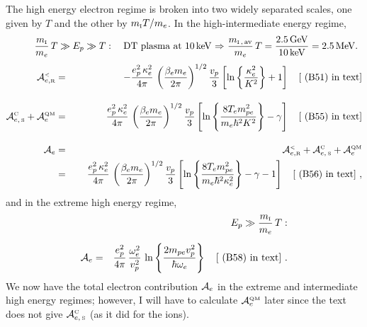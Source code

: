 \documentclass[preprint,12pt,eqsecnum,nofootinbib,amsmath,amssymb]{revtex4}
\newcommand{\smC}{{\rm\scriptscriptstyle C}}
\newcommand{\smI}{{\rm\scriptscriptstyle I}}
\newcommand{\smR}{{\rm\scriptscriptstyle R}}
\newcommand{\smS}{{\rm\scriptscriptstyle S}}
\newcommand{\smQM}{{\rm\scriptscriptstyle QM}}
\newcommand{\smLT}{{\rm\scriptscriptstyle <}}
\begin{document}
The high energy electron regime is broken into two widely separated
scales, one given by $T$ and the other by $m_\smI T/m_e$. In the 
high-intermediate energy regime, 
\begin{eqnarray}
  && \hskip-1.5cm 
  \frac{m_\smI}{m_e}\,T \gg E_p \gg T : 
  ~~~\text{DT plasma at 10\,keV $\Rightarrow$ $\frac{m_{\smI \,,\,{\rm
  av}}}{m_e}\, T = \frac{2.5\,{\rm GeV}}{10\,{\rm keV}}=2.5\,{\rm MeV}$. }
\nonumber
\\[3pt]
  {\cal A}_{e, \smR}^\smLT 
  &=& 
  -\frac{e_p^2\, \kappa_e^2}{4\pi}\, 
  \left(\frac{\beta_e m_e}{2\pi} \right)^{1/2}
  \frac{v_p}{3}
  \left[ \ln\left\{ \frac{\kappa_e^2}{K^2}\right\}+1 \right]
  ~~~\text{[ (B51) in text]} 
\label{Aea}
\\[10pt]
  {\cal A}_{e, \,\smS}^\smC  + {\cal A}_e^\smQM
  &=&
  \frac{e_p^2\, \kappa_e^2}{4\pi}\, 
  \left(\frac{\beta_e m_e}{2\pi} \right)^{1/2}
  \frac{v_p}{3}
  \left[ \ln\left\{ \frac{8 T_e m_{pe}^2}{m_e \hbar^2 K^2}\right\} - \gamma \right]
  ~~~\text{[ (B55) in text]}  
\label{Aeb}
\\[10pt]
  {\cal A}_e &=& 
  {\cal A}_{e, \smR}^\smLT + {\cal A}_{e, \,\smS}^\smC  
  + {\cal A}_e^\smQM
\nonumber
\\
  &=&
  \frac{e_p^2\, \kappa_e^2}{4\pi}\, 
  \left(\frac{\beta_e m_e}{2\pi} \right)^{1/2}
  \frac{v_p}{3}
  \left[ \ln\left\{ \frac{8 T_e m_{pe}^2}{m_e \hbar^2 \kappa_e^2}\right\} 
  - \gamma  -1\right]
  ~~~\text{[ (B56) in text]}  \ ,
\label{Aec}
\end{eqnarray}
and in the extreme high energy regime, 
\begin{eqnarray}
  && \hskip-1.5cm 
  E_p \gg \frac{m_\smI}{m_e}\,T :
\nonumber
\\[5pt]
  {\cal A}_e &=& 
  \frac{e_p^2}{4\pi}\,\frac{\omega_e^2}{v_p^2}\,
  \ln\left\{\frac{2 m_{pe} v_p^2}{\hbar \omega_e} \right\}
  ~~~\text{[ (B58) in text]}  \ .
\end{eqnarray}
We now have the total electron contribution ${\cal A}_e$ in the
extreme and intermediate high energy regimes; however, I will have to
calculate ${\cal A}_e^\smQM$ later since the text does not give ${\cal
A}_{e,\,\smS}^\smC$ (as it did for the ions).  
\end{document}
